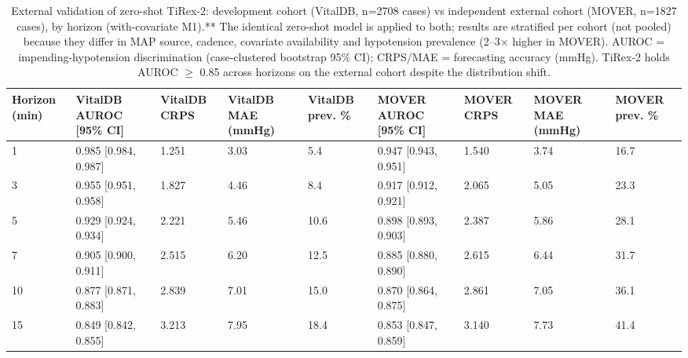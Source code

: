 \documentclass[10pt]{article}
\begin{document}
\begin{table}[H]\centering\footnotesize
\caption{External validation of zero-shot TiRex-2: development cohort (VitalDB, n=2708 cases) vs independent external cohort (MOVER, n=1827 cases), by horizon (with-covariate M1).** The identical zero-shot model is applied to both; results are stratified per cohort (not pooled) because they differ in MAP source, cadence, covariate availability and hypotension prevalence (2--3$\times$ higher in MOVER). AUROC = impending-hypotension discrimination (case-clustered bootstrap 95\% CI); CRPS/MAE = forecasting accuracy (mmHg). TiRex-2 holds AUROC $\geq$ 0.85 across horizons on the external cohort despite the distribution shift.}
\begin{adjustbox}{max width=\textwidth}
\begin{tabular}{lllllllll}
\toprule
\textbf{Horizon (min)} & \textbf{VitalDB AUROC [95\% CI]} & \textbf{VitalDB CRPS} & \textbf{VitalDB MAE (mmHg)} & \textbf{VitalDB prev. \%} & \textbf{MOVER AUROC [95\% CI]} & \textbf{MOVER CRPS} & \textbf{MOVER MAE (mmHg)} & \textbf{MOVER prev. \%} \\
\midrule
1 & 0.985 [0.984, 0.987] & 1.251 & 3.03 & 5.4 & 0.947 [0.943, 0.951] & 1.540 & 3.74 & 16.7 \\
3 & 0.955 [0.951, 0.958] & 1.827 & 4.46 & 8.4 & 0.917 [0.912, 0.921] & 2.065 & 5.05 & 23.3 \\
5 & 0.929 [0.924, 0.934] & 2.221 & 5.46 & 10.6 & 0.898 [0.893, 0.903] & 2.387 & 5.86 & 28.1 \\
7 & 0.905 [0.900, 0.911] & 2.515 & 6.20 & 12.5 & 0.885 [0.880, 0.890] & 2.615 & 6.44 & 31.7 \\
10 & 0.877 [0.871, 0.883] & 2.839 & 7.01 & 15.0 & 0.870 [0.864, 0.875] & 2.861 & 7.05 & 36.1 \\
15 & 0.849 [0.842, 0.855] & 3.213 & 7.95 & 18.4 & 0.853 [0.847, 0.859] & 3.140 & 7.73 & 41.4 \\
\bottomrule
\end{tabular}
\end{adjustbox}
\end{table}
\end{document}

